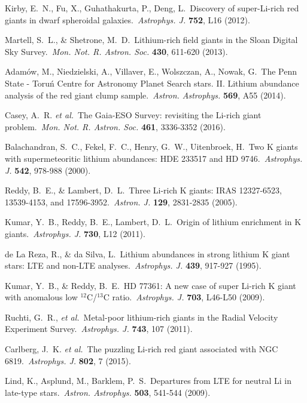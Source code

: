 \documentclass[twoside,onecolumnm,12pt]{article}
\begin{document}
\begin{thebibliography}{99}
 Kirby, E.~N., Fu, X., Guhathakurta, P., Deng, L.\ Discovery of super-Li-rich red giants in dwarf spheroidal galaxies.\ \emph{Astrophys. J.} \textbf{752}, L16 (2012). %

 Martell, S.~L., \& Shetrone, M.~D.\ Lithium-rich field giants in the Sloan Digital Sky Survey.\ \emph{Mon. Not. R. Astron. Soc.} \textbf{430}, 611-620 (2013). %

 Adam{\'o}w, M., Niedzielski, A., Villaver, E., Wolszczan, A., Nowak, G.\ The Penn State - Toru{\'n} Centre for Astronomy Planet Search stars. II. Lithium abundance analysis of the red giant clump sample.\ \emph{Astron. Astrophys.} \textbf{569}, A55 (2014). %

 Casey, A.~R. \emph{et al.}\ The Gaia-ESO Survey: revisiting the Li-rich giant problem.\ \emph{Mon. Not. R. Astron. Soc.} \textbf{461}, 3336-3352 (2016). %

 Balachandran, S.~C., Fekel, F.~C., Henry, G.~W., Uitenbroek, H.\ Two K giants with supermeteoritic lithium abundances: HDE 233517 and HD 9746.\ \emph{Astrophys. J.} \textbf{542}, 978-988 (2000). %

 Reddy, B.~E., \& Lambert, D.~L.\ Three Li-rich K giants: IRAS 12327-6523, 13539-4153, and 17596-3952.\ \emph{Astron. J.} \textbf{129}, 2831-2835 (2005). %

 Kumar, Y.~B., Reddy, B.~E., Lambert, D.~L.\ Origin of lithium enrichment in K giants.\ \emph{Astrophys. J.} \textbf{730}, L12 (2011). %

 de La Reza, R., \& da Silva, L.\ Lithium abundances in strong lithium K giant stars: LTE and non-LTE analyses.\ \emph{Astrophys. J.} \textbf{439}, 917-927 (1995). %

 Kumar, Y.~B., \& Reddy, B.~E.\ HD 77361: A new case of super Li-rich K giant with anomalous low $^{12}$C/$^{13}$C ratio.\ \emph{Astrophys. J.} \textbf{703}, L46-L50 (2009). %

 Ruchti, G.~R., \emph{et al.}\ Metal-poor lithium-rich giants in the Radial Velocity Experiment Survey.\ \emph{Astrophys. J.} \textbf{743}, 107 (2011). %

 Carlberg, J.~K. \emph{et al.}\ The puzzling Li-rich red giant associated with NGC 6819.\ \emph{Astrophys. J.} \textbf{802}, 7 (2015). %

 Lind, K., Asplund, M., Barklem, P.~S.\ Departures from LTE for neutral Li in late-type stars.\ \emph{Astron. Astrophys.} \textbf{503}, 541-544 (2009). %


\end{thebibliography}
\end{document}
